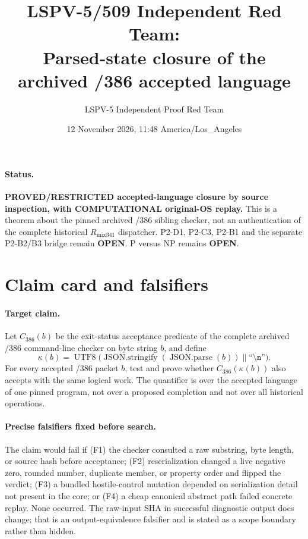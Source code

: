 \documentclass[11pt]{article}
\title{LSPV-5/509 Independent Red Team:\\
Parsed-state closure of the archived /386 accepted language}
\author{LSPV-5 Independent Proof Red Team}
\date{12 November 2026, 11:48 America/Los\_Angeles}
\newcommand{\OPEN}{\textbf{OPEN}}
\begin{document}
\maketitle

\paragraph{Status.}
\textbf{PROVED/RESTRICTED accepted-language closure by source inspection,
with COMPUTATIONAL original-OS replay.}
This is a theorem about the pinned archived /386 sibling checker, not an
authentication of the complete historical $R_{\mathrm{mix341}}$ dispatcher.
P2-D1, P2-C3, P2-B1 and the separate P2-B2/B3 bridge remain \OPEN.
P versus NP remains \OPEN.

\section{Claim card and falsifiers}
\paragraph{Target claim.}
Let $C_{386}(b)$ be the exit-status acceptance predicate of the complete
archived /386 command-line checker on byte string $b$, and define
\[
  \kappa(b)=\operatorname{UTF8}\bigl(
       \operatorname{JSON.stringify}(\operatorname{JSON.parse}(b))
       \mathbin{\|}\texttt{``\textbackslash n''}\bigr).
\]
For every accepted /386 packet $b$, test and prove whether
$C_{386}(\kappa(b))$ also accepts with the same logical work.  The quantifier
is over the accepted language of one pinned program, not over a proposed
completion and not over all historical operations.

\paragraph{Precise falsifiers fixed before search.}
The claim would fail if (F1) the checker consulted a raw substring, byte
length, or source hash before acceptance; (F2) reserialization changed a live
negative zero, rounded number, duplicate member, or property order and flipped
the verdict; (F3) a bundled hostile-control mutation depended on serialization
detail not present in the core; or (F4) a cheap canonical abstract path failed
concrete replay.  None occurred.  The raw-input SHA in successful diagnostic
output does change; that is an output-equivalence falsifier and is stated as a
scope boundary rather than hidden.
\end{document}
